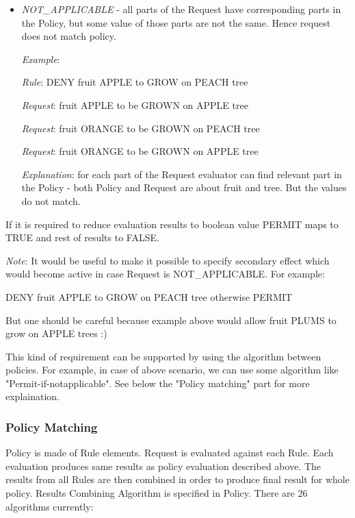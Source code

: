 \documentclass{article}                            %
\begin{document}
\begin{itemize}
    \item  \emph{NOT\_APPLICABLE} - all parts of the Request have corresponding parts in the Policy, but some value of those parts are not the same. Hence request does not match policy.

        \emph{Example}:

            \emph{Rule}: DENY fruit APPLE to GROW on PEACH tree

            \emph{Request}: fruit APPLE to be GROWN on APPLE tree 

            \emph{Request}: fruit ORANGE to be GROWN on PEACH tree 

            \emph{Request}: fruit ORANGE to be GROWN on APPLE tree 

        \emph{Explanation}: for each part of the Request evaluator can find relevant part in the Policy - both Policy and Request are about fruit and tree. But the values do not match.

\end{itemize}

If it is required to reduce evaluation results to boolean value PERMIT maps to TRUE and rest of results to FALSE.

\emph{Note}: It would be useful to make it possible to specify secondary effect which would become active in case Request is NOT\_APPLICABLE. For example:

DENY fruit APPLE to GROW on PEACH tree otherwise PERMIT

But one should be careful because example above would allow fruit PLUMS to grow on APPLE trees :)

This kind of requirement can be supported by using the algorithm between policies.  For example, in case of above scenario, we can use some algorithm like "Permit-if-notapplicable". See below the "Policy matching" part for more explaination.  


\subsubsection{Policy Matching} %
\label{subsubsec:poicy_matching}
Policy is made of Rule elements. Request is evaluated against each Rule. Each evaluation produces same results as policy evaluation described above. The results from all Rules are then combined in order to produce final result for whole policy. Results Combining Algorithm is specified in Policy. There are 26 algorithms currently:
\end{document}
